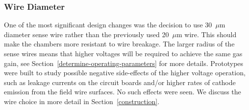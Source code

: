 \subsubsection{Wire Diameter}

One of the most significant design changes was the decision 
to use 30~$\mu$m diameter sense wire rather than the previously used 
20~$\mu$m wire. This should make the chambers more resistant to wire 
breakage.  The larger radius of the sense wires means that higher 
voltages will be required to achieve the same gas gain, see
Section~\ref{determine-operating-parameters} for more details.
Prototypes were built to study possible negative side-effects of the 
higher voltage operation, such as leakage currents on the circuit boards 
and/or higher rates of cathode emission from the field wire surfaces.
No such effects were seen.
We discuss the wire choice in more detail in Section~\ref{construction}.




 
